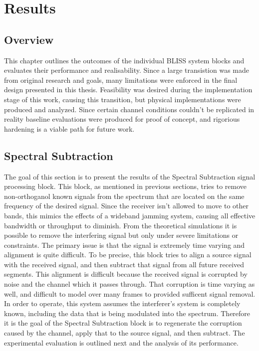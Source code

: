 \chapter{Results}
\label{ch:results}

\section{Overview}

This chapter outlines the outcomes of the individual BLISS system blocks and evaluates their performance and realisability.  Since a large transistion was made from original research and goals, many limitations were enforced in the final design presented in this thesis.  Feasibility was desired during the implementation stage of this work, causing this transition, but physical implementations were produced and analyzed.  Since certain channel conditions couldn't be replicated in reality baseline evaluations were produced for proof of concept, and rigorious hardening is a viable path for future work.\\ 

\section{Spectral Subtraction}

The goal of this section is to present the results of the Spectral Subtraction signal processing block.  This block, as mentioned in previous sections, tries to remove non-orthoganol known signals from the spectrum that are located on the same frequency of the desired signal.  Since the receiver isn't allowed to move to other bands, this mimics the effects of a wideband jamming system, causing all effective bandwidth or throughput to diminish.  From the theoretical simulations it is possible to remove the interfering signal but only under severe limitations or constraints.  The primary issue is that the signal is extremely time varying and alignment is quite difficult.  To be precise, this block tries to align a source signal with the received signal, and then subtract that signal from all future received segments. This alignment is difficult because the received signal is corrupted by noise and the channel which it passes through. That corruption is time varying as well, and difficult to model over many frames to provided sufficent signal removal.  In order to operate, this system assumes the interferer's system is completely known, including the data that is being modulated into the spectrum.  Therefore it is the goal of the Spectral Subtraction block is to regenerate the corruption caused by the channel, apply that to the source signal, and then subtract.  The experimental evaluation is outlined next and the analysis of its performance.\\

